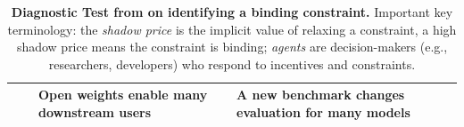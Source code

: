 \begin{table}[t]
{\begin{tabular}{@{}p{}p{}p{}p{}@{}}
             &
             & Open weights enable many downstream users
             & A new benchmark changes evaluation for many models                                                                                                                                                                                                                                                                            \\
            \bottomrule
        \end{tabular}}
    \caption{
        \textbf{Diagnostic Test from \citet{hausmann2008growth} on identifying a binding constraint.}
        Important key terminology: the \textit{shadow price} is the implicit value of relaxing a constraint, a high shadow price means the constraint is binding; \textit{agents} are decision-makers (e.g., researchers, developers) who respond to incentives and constraints.
    }
    \label{table:binding_constraint_diagnostic}
\end{table}
